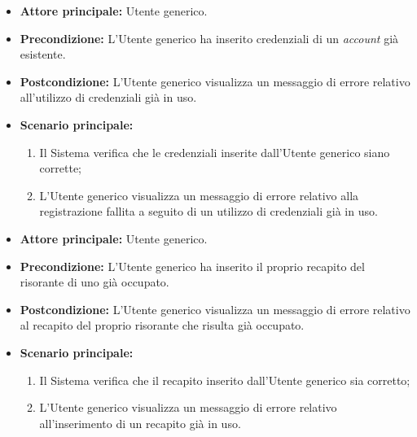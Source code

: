 \label{usecase:Errore registrazione account esistente}
\begin{itemize}

	\item \textbf{Attore principale:} Utente generico.

	\item \textbf{Precondizione:} L'Utente generico ha inserito credenziali di un \textit{account} già esistente.

	\item \textbf{Postcondizione:} L'Utente generico visualizza un messaggio di errore relativo all'utilizzo di credenziali già in uso.

	\item \textbf{Scenario principale:}
	\begin{enumerate}
        \item Il Sistema verifica che le credenziali inserite dall'Utente generico siano corrette;
        \item L'Utente generico visualizza un messaggio di errore relativo alla registrazione fallita a seguito di un utilizzo di credenziali già in uso.
	\end{enumerate}
	
\end{itemize}

\label{usecase:Errore registrazione recapito occupato}
\begin{itemize}

	\item \textbf{Attore principale:} Utente generico.

	\item \textbf{Precondizione:} L'Utente generico ha inserito il proprio recapito del risorante di uno già occupato.
	
	\item \textbf{Postcondizione:} L'Utente generico visualizza un messaggio di errore relativo al recapito del proprio risorante che risulta già occupato.

	\item \textbf{Scenario principale:}
	\begin{enumerate}
        \item Il Sistema verifica che il recapito inserito dall'Utente generico sia corretto;
        \item L'Utente generico visualizza un messaggio di errore relativo all'inserimento di un recapito già in uso.
	\end{enumerate}
	
\end{itemize}